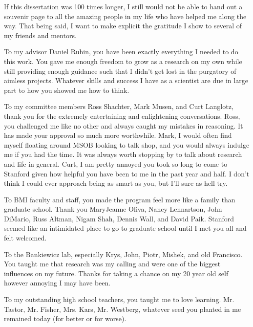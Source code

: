 If this dissertation was 100 times longer, I still would not be able to hand out a souvenir page to all the amazing people in my life who have helped me along the way. That being said, I want to make explicit the gratitude I show to several of my friends and mentors.

To my advisor Daniel Rubin, you have been exactly everything I needed to do this work. You gave me enough freedom to grow as a research on my own while still providing enough guidance such that I didn't get lost in the purgatory of aimless projects. Whatever skills and success I have as a scientist are due in large part to how you showed me how to think.

To my committee members Ross Shachter, Mark Musen, and Curt Langlotz, thank you for the extremely entertaining and enlightening conversations. Ross, you challenged me like no other and always caught my mistakes in reasoning. It has made your approval so much more worthwhile. Mark, I would often find myself floating around MSOB looking to talk shop, and you would always indulge me if you had the time. It was always worth stopping by to talk about research and life in general. Curt, I am pretty annoyed you took so long to come to Stanford given how helpful you have been to me in the past year and half. I don't think I could ever approach being as smart as you, but I'll sure as hell try.

To BMI faculty and staff, you made the program feel more like a family than graduate school. Thank you MaryJeanne Oliva, Nancy Lennartson, John DiMario, Russ Altman, Nigam Shah, Dennis Wall, and David Paik. Stanford seemed like an intimidated place to go to graduate school until I met you all and felt welcomed.

To the Bankiewicz lab, especially Krys, John, Piotr, Mishek, and old Francisco. You taught me that research was my calling and were one of the biggest influences on my future. Thanks for taking a chance on my 20 year old self however annoying I may have been.

To my outstanding high school teachers, you taught me to love learning. Mr. Tastor, Mr. Fisher, Mrs. Kars, Mr. Westberg, whatever seed you planted in me remained today (for better or for worse).

